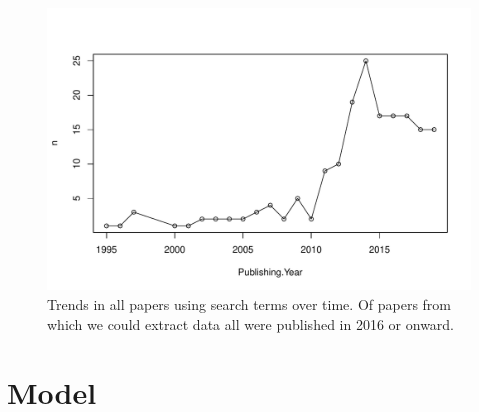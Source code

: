 \documentclass[11pt,letter]{article}
\begin{document}
\begin{figure}[t!]
\centering
\includegraphics[width=1\textwidth]{..//..//R/graphs/otherdat/papersovertime.pdf}
\caption{Trends in all papers using search terms over time. Of papers from which we could extract data all were published in 2016 or onward.}
  \label{fig:papertrends}
\end{figure}


\newpage 
\section{Model}
\end{document}
